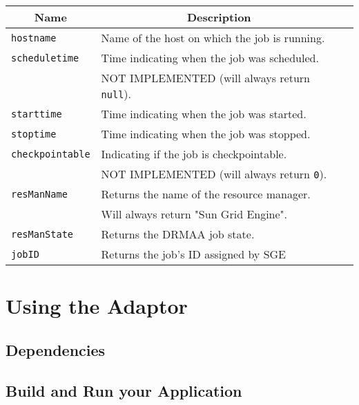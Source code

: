 \documentclass[bibtotocnumbered, headsepline,normalheadings]{scrreprt}
\begin{document}
\begin{center}
\begin{tabular}{|l|l|l|} \hline
	\multicolumn{1}{|c|}{Name}&
	\multicolumn{1}{|c|}{Description}\\ \hline\hline
	 \texttt{hostname}   		& Name of the host on which the job is running. 		\\ \hline
	 \texttt{scheduletime} 		& Time indicating when the job was scheduled. 			\\
	 							& NOT IMPLEMENTED (will always return \texttt{null}).	\\ \hline
	 \texttt{starttime}   		& Time indicating when the job was started.				\\ \hline
	 \texttt{stoptime}   		& Time indicating when the job was stopped.				\\ \hline
	 \texttt{checkpointable} 	& Indicating if the job is checkpointable. 				\\
	 							& NOT IMPLEMENTED (will always return \texttt{0}).		\\ \hline
	 \texttt{resManName} 		& Returns the name of the resource manager.				\\
	 							& Will always return "Sun Grid Engine".				 	\\ \hline
	 \texttt{resManState} 		& Returns the DRMAA job state.			 				\\ \hline	 
 	 \texttt{jobID} 			& Returns the job's ID assigned by SGE					\\ \hline
\end{tabular}
\end{center}

\chapter{Using the Adaptor}

\section{Dependencies}

\section{Build and Run your Application}

\end{document}

